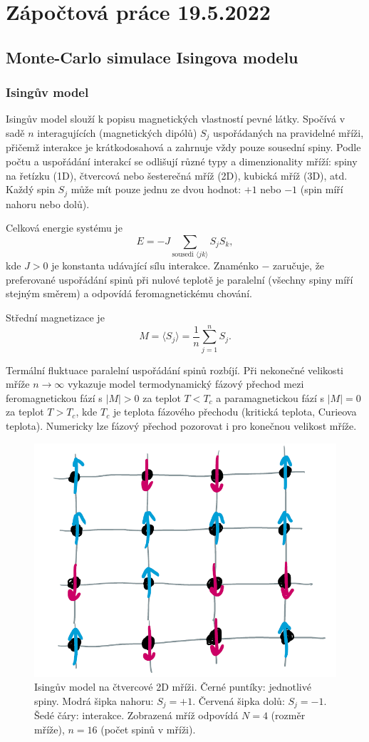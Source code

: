 \documentclass[a4paper,11pt,twoside]{article}
\def\abs#1{\left|#1\right|}
\begin{document}
\section*{Zápočtová práce 19.5.2022}
\subsection*{Monte-Carlo simulace Isingova modelu}
\subsubsection*{Isingův model}
Isingův model slouží k popisu magnetických vlastností pevné látky. 
Spočívá v sadě $n$ interagujících  (magnetických dipólů) $S_{j}$ uspořádaných na pravidelné mříži, přičemž interakce je krátkodosahová a zahrnuje vždy pouze sousední spiny.
Podle počtu a uspořádání interakcí se odlišují různé typy a dimenzionality mříží: spiny na řetízku (1D), čtvercová nebo šesterečná mříž (2D), kubická mříž (3D), atd.
Každý spin $S_{j}$ může mít pouze jednu ze dvou hodnot: $+1$ nebo $-1$ (spin míří nahoru nebo dolů).

Celková energie systému je
\begin{equation}\label{eq:Hamiltonian}
	E=-J\sum_{\text{sousedi }\langle jk\rangle}S_{j}S_{k},
\end{equation}
kde $J>0$ je konstanta udávající sílu interakce.
Znaménko $-$ zaručuje, že preferované uspořádání spinů při nulové teplotě je paralelní (všechny spiny míří stejným směrem) a odpovídá feromagnetickému chování.

Střední magnetizace je 
\begin{equation}\label{eq:Magnetisation}
	M=\langle S_{j}\rangle=\frac{1}{n}\sum_{j=1}^{n}S_{j}.
\end{equation}

Termální fluktuace paralelní uspořádání spinů rozbíjí.
Při nekonečné velikosti mříže $n\rightarrow\infty$ vykazuje model termodynamický fázový přechod mezi feromagnetickou fází s $\abs{M}>0$ za teplot $T<T_{c}$ a paramagnetickou fází s $\abs{M}=0$ za teplot $T>T_{c}$, kde  $T_{c}$ je teplota fázového přechodu (kritická teplota, Curieova teplota).
Numericky lze fázový přechod pozorovat i pro konečnou velikost mříže.

\begin{figure}[!htbp]
	\centering\includegraphics[width=0.495\linewidth]{Ising.png}
	\caption{
		\protect\small
		Isingův model na čtvercové 2D mříži.
		Černé puntíky: jednotlivé spiny.
		Modrá šipka nahoru: $S_{j}=+1$.
		Červená šipka dolů: $S_{j}=-1$.
		Šedé čáry: interakce.
		Zobrazená mříž odpovídá $N=4$ (rozměr mříže), $n=16$ (počet spinů v mříži).
	}	
	\label{fig:2DIsing}
\end{figure}
\end{document}
